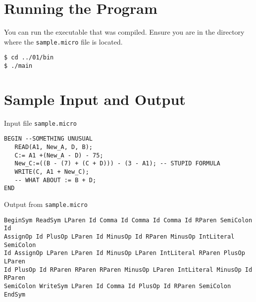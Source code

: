 \documentclass[11pt]{article}
\begin{document}
\section{Running the Program}
\label{sec-5}
You can run the executable that was compiled. Ensure you are in the directory
where the \texttt{sample.micro} file is located.
\begin{verbatim}
$ cd ../01/bin
$ ./main
\end{verbatim}

\section{Sample Input and Output}
\label{sec-6}
Input file \texttt{sample.micro}
\begin{verbatim}
BEGIN --SOMETHING UNUSUAL
   READ(A1, New_A, D, B);
   C:= A1 +(New_A - D) - 75;
   New_C:=((B - (7) + (C + D))) - (3 - A1); -- STUPID FORMULA
   WRITE(C, A1 + New_C);
   -- WHAT ABOUT := B + D;
END
\end{verbatim}
Output from \texttt{sample.micro}
\begin{verbatim}
BeginSym ReadSym LParen Id Comma Id Comma Id Comma Id RParen SemiColon Id 
AssignOp Id PlusOp LParen Id MinusOp Id RParen MinusOp IntLiteral SemiColon
Id AssignOp LParen LParen Id MinusOp LParen IntLiteral RParen PlusOp LParen
Id PlusOp Id RParen RParen RParen MinusOp LParen IntLiteral MinusOp Id RParen
SemiColon WriteSym LParen Id Comma Id PlusOp Id RParen SemiColon EndSym
\end{verbatim}
\end{document}
